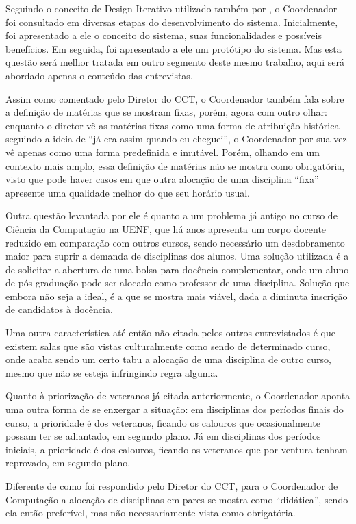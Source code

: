 Seguindo o conceito de Design Iterativo utilizado também por , o Coordenador foi consultado em diversas etapas do desenvolvimento do sistema. Inicialmente, foi apresentado a ele o conceito do sistema, suas funcionalidades e possíveis benefícios. Em seguida, foi apresentado a ele um protótipo do sistema. Mas esta questão será melhor tratada em outro segmento deste mesmo trabalho, aqui será abordado apenas o conteúdo das entrevistas.

Assim como comentado pelo Diretor do CCT, o Coordenador também fala sobre a definição de matérias que se mostram fixas, porém, agora com outro olhar: enquanto o diretor vê as matérias fixas como uma forma de atribuição histórica seguindo a ideia de ``já era assim quando eu cheguei'', o Coordenador por sua vez vê apenas como uma forma predefinida e imutável. Porém, olhando em um contexto mais amplo, essa definição de matérias não se mostra como obrigatória, visto que pode haver casos em que outra alocação de uma disciplina ``fixa'' apresente uma qualidade melhor do que seu horário usual.

Outra questão levantada por ele é quanto a um problema já antigo no curso de Ciência da Computação na UENF, que há anos apresenta um corpo docente reduzido em comparação com outros cursos, sendo necessário um desdobramento maior para suprir a demanda de disciplinas dos alunos. Uma solução utilizada é a de solicitar a abertura de uma bolsa para docência complementar, onde um aluno de pós-graduação pode ser alocado como professor de uma disciplina. Solução que embora não seja a ideal, é a que se mostra mais viável, dada a diminuta inscrição de candidatos à docência.

Uma outra característica até então não citada pelos outros entrevistados é que existem salas que são vistas culturalmente como sendo de determinado curso, onde acaba sendo um certo tabu a alocação de uma disciplina de outro curso, mesmo que não se esteja infringindo regra alguma.

Quanto à priorização de veteranos já citada anteriormente, o Coordenador aponta uma outra forma de se enxergar a situação: em disciplinas dos períodos finais do curso, a prioridade é dos veteranos, ficando os calouros que ocasionalmente possam ter se adiantado, em segundo plano. Já em disciplinas dos períodos iniciais, a prioridade é dos calouros, ficando os veteranos que por ventura tenham reprovado, em segundo plano.

Diferente de como foi respondido pelo Diretor do CCT, para o Coordenador de Computação a alocação de disciplinas em pares se mostra como ``didática'', sendo ela então preferível, mas não necessariamente vista como obrigatória.

